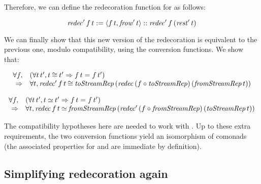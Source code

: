 \noindent
Therefore, we can define the redecoration function for \TriS{} as
follows: 
\begin{definition}\label{def:redecS}
  $$\mathit{redec'}\,f\,t := \langle f\,t,\mathit{frow'}\,t\rangle :: \mathit{redec'}\,f\,(\mathit{rest'}\,t)$$
\end{definition}
We can finally show that this new version of the redecoration is
equivalent to the previous one, modulo compatibility, using the conversion functions. We
show that:
\begin{lemma}\label{lemma:redecS_redec}
  $$
  \begin{array}{rl}
    \forall f, &
    (\forall t\,t', t \mathbin{\cong} t' \Rightarrow f\,t = f\,t') \\
    \Rightarrow &
    \forall t, \mathit{redec'}\,f\,t \mathbin{\cong} \mathit{toStreamRep}\,(\mathit{redec}\,(f \circ
    \mathit{toStreamRep})\,(\mathit{fromStreamRep}\,t)) 
  \end{array}
  $$ 
\end{lemma}
\begin{lemma}\label{lemma:redec_redecS}
  $$
  \begin{array}{rl}
    \forall f, &
    (\forall t\,t', t \mathbin{\simeq} t' \Rightarrow f\,t = f\,t') \\
    \Rightarrow & \forall t, \mathit{redec}\,f\,t \mathbin{\simeq} \mathit{fromStreamRep}\,(\mathit{redec'}\,(f \circ
    \mathit{fromStreamRep})\,(\mathit{toStreamRep}\,t)) 
  \end{array}
  $$
\end{lemma}
\begin{remark}
  The compatibility hypotheses here are needed to work with \Tri{}. Up
  to these extra requirements, the two conversion functions yield an
  isomorphism of comonads (the associated properties for \topT{} and
  \topS{} are immediate by definition).
\end{remark}


\subsection{Simplifying redecoration again}

